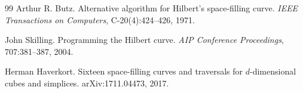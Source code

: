 \documentclass[11pt]{article}
\theoremstyle{definition}
\begin{document}
\begin{thebibliography}{99}
Arthur R. Butz.
\newblock Alternative algorithm for Hilbert's space-filling curve.
\newblock \emph{IEEE Transactions on Computers}, C-20(4):424--426, 1971.

John Skilling.
\newblock Programming the Hilbert curve.
\newblock \emph{AIP Conference Proceedings}, 707:381--387, 2004.

Herman Haverkort.
\newblock Sixteen space-filling curves and traversals for $d$-dimensional cubes and simplices.
\newblock arXiv:1711.04473, 2017.

\end{thebibliography}
\end{document}
